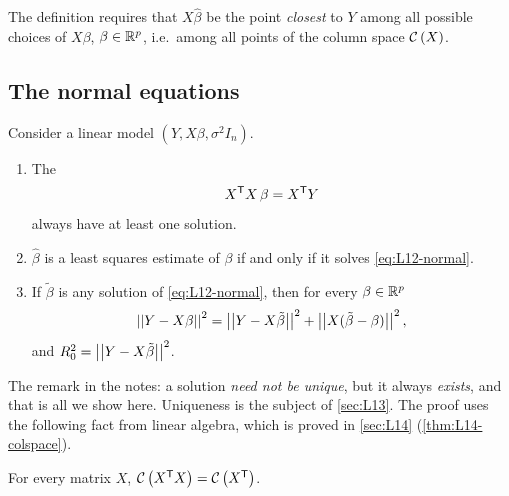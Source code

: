 \begin{remark}\label{rem:L12-closest}
The definition requires that $X\hat\beta$ be the point \emph{closest} to $Y$ among all possible
choices of $X\beta$, $\beta\in\mathbb R^p$, i.e.\ among all points of the column space $\mathcal{C}\left(X\right)$.
\end{remark}

\subsection{The normal equations}
\begin{theorem}\label{thm:L12-normal}
Consider a linear model $(Y,X\beta,\sigma^2I_n)$.
\begin{enumerate}
  \item The 
  \begin{equation}\label{eq:L12-normal}
  X^{\mathsf T} X\,\beta=X^{\mathsf T} Y
  \end{equation}
  always have at least one solution.
  \item $\hat\beta$ is a least squares estimate of $\beta$ if and only if it solves \eqref{eq:L12-normal}.
  \item If $\tilde\beta$ is any solution of \eqref{eq:L12-normal}, then for every $\beta\in\mathbb R^p$
  \begin{equation}\label{eq:L12-pyth}
  \left|\left|Y-X\beta\right|\right|^2=\left|\left|Y-X\tilde\beta\right|\right|^2+\left|\left|X(\tilde\beta-\beta)\right|\right|^2,
  \end{equation}
  and $R_0^2=\left|\left|Y-X\tilde\beta\right|\right|^2$.
\end{enumerate}
\end{theorem}
The remark in the notes: a solution \emph{need not be unique}, but it always \emph{exists}, and that is
all we show here. Uniqueness is the subject of \cref{sec:L13}. The proof uses the following fact
from linear algebra, which is proved in \cref{sec:L14} (\cref{thm:L14-colspace}).

\begin{lemma}\label{lem:L12-colspace}
For every matrix $X$, $\mathcal{C}\left(X^{\mathsf T} X\right)=\mathcal{C}\left(X^{\mathsf T}\right)$.
\end{lemma}

